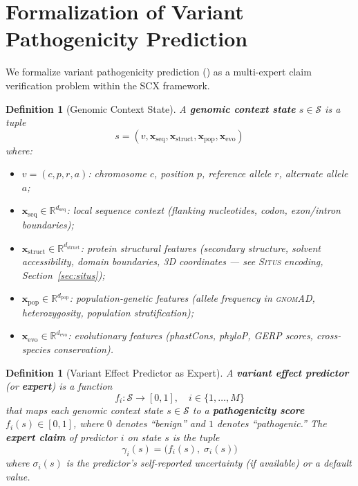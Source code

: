 \documentclass[11pt,a4paper]{article}
\newtheorem{definition}[theorem]{Definition}
\theoremstyle{definition}
\newcommand{\R}{\mathbb{R}}
\newcommand{\calS}{\mathcal{S}}
\newcommand{\SCX}{\textsc{SCX}}
\newcommand{\situs}{\textsc{Situs}}
\newcommand{\gnomAD}{\textsc{gnomAD}}
\newcommand{\pathovar}{}
\begin{document}
\section{Formalization of Variant Pathogenicity Prediction}
\label{sec:formalization}
We formalize variant pathogenicity prediction (\pathovar{}) as a multi-expert claim verification problem within the \SCX{} framework.
\begin{definition}[Genomic Context State]
\label{def:state}
A \textbf{genomic context state} $s \in \calS$ is a tuple
\begin{equation}
    s = (v, \mathbf{x}_{\text{seq}}, \mathbf{x}_{\text{struct}}, \mathbf{x}_{\text{pop}}, \mathbf{x}_{\text{evo}})
\end{equation}
where:
\begin{itemize}[leftmargin=*]
    \item $v = (c, p, r, a)$: chromosome $c$, position $p$, reference allele $r$, alternate allele $a$;
    \item $\mathbf{x}_{\text{seq}} \in \R^{d_{\text{seq}}}$: local sequence context (flanking nucleotides, codon, exon/intron boundaries);
    \item $\mathbf{x}_{\text{struct}} \in \R^{d_{\text{struct}}}$: protein structural features (secondary structure, solvent accessibility, domain boundaries, 3D coordinates — see \situs{} encoding, Section~\ref{sec:situs});
    \item $\mathbf{x}_{\text{pop}} \in \R^{d_{\text{pop}}}$: population-genetic features (allele frequency in \gnomAD, heterozygosity, population stratification);
    \item $\mathbf{x}_{\text{evo}} \in \R^{d_{\text{evo}}}$: evolutionary features (phastCons, phyloP, GERP scores, cross-species conservation).
\end{itemize}
\end{definition}
\begin{definition}[Variant Effect Predictor as Expert]
\label{def:expert}
A \textbf{variant effect predictor} (or \textbf{expert}) is a function
\begin{equation}
    f_i: \calS \to [0,1], \quad i \in \{1, \dots, M\}
\end{equation}
that maps each genomic context state $s \in \calS$ to a \textbf{pathogenicity score} $f_i(s) \in [0,1]$, where $0$ denotes ``benign'' and $1$ denotes ``pathogenic.''
The \textbf{expert claim} of predictor $i$ on state $s$ is the tuple
\begin{equation}
    \gamma_i(s) = \big( f_i(s),\; \sigma_i(s) \big)
\end{equation}
where $\sigma_i(s)$ is the predictor's self-reported uncertainty (if available) or a default value.
\end{definition}
\end{document}
